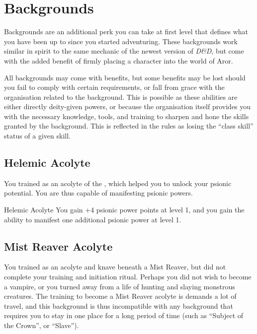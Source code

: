 \section{Backgrounds}
\label{sec:Backgrounds}

Backgrounds are an additional perk you can take at first level that defines
what you have been up to since you started adventuring. These backgrounds work
similar in spirit to the same mechanic of the newest version of \emph{D\&D}, but
come with the added benefit of firmly placing a character into the world of
Aror.

All backgrounds may come with benefits, but some benefits may be lost should
you fail to comply with certain requirements, or fall from grace with the
organisation related to the background. This is possible as these abilities
are either directly deity-given powers, or because the organisation itself
provides you with the necessary knowledge, tools, and training to sharpen and
hone the skills granted by the background. This is reflected in the rules as
losing the ``class skill'' status of a given skill.

\subsection{Helemic Acolyte}
\label{sec:Helemic Acolyte}

You trained as an acolyte of the , which helped
you to unlock your psionic potential. You are thus capable of manifesting
psionic powers.

\begin{35e}{Helemic Acolyte}
  You gain +4 psionic power points at level 1, and you gain the ability to
  manifest one additional psionic power at level 1.
\end{35e}

\subsection{Mist Reaver Acolyte}
\label{sec:Mist Reaver Acolyte}

You trained as an acolyte and knave beneath a Mist Reaver, but did not
complete your training and initiation ritual. Perhaps you did not wish to
become a vampire, or you turned away from a life of hunting and slaying
monstrous creatures. The training to become a Mist Reaver acolyte is demands a
lot of travel, and this background is thus incompatible with any background
that requires you to stay in one place for a long period of time (such as
``Subject of the Crown'', or ``Slave'').

